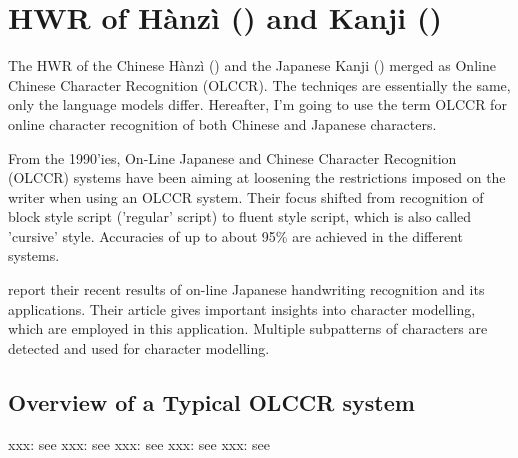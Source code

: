 \section{HWR of Hànzì () and Kanji ()}
\label{sec:hwrofhanziandkanji}


The HWR of the Chinese Hànzì () and the Japanese Kanji () 
merged as Online Chinese Character Recognition (OLCCR). The techniqes are 
essentially the same, only the language models differ. Hereafter, I'm going to 
use the term OLCCR for online character recognition of both Chinese and Japanese
characters.

From the 1990'ies, On-Line Japanese and Chinese Character Recognition 
(OLCCR) systems have been aiming at loosening the restrictions imposed on 
the writer when using an OLCCR system. Their focus shifted from recognition 
of block style script ('regular' script) to fluent style script, 
which is also called 'cursive' style. Accuracies of up to about 95\% are
achieved in the different systems.

 report their recent results of on-line Japanese 
handwriting recognition and its applications. Their article gives 
important insights into character modelling, which are employed in 
this application. Multiple subpatterns of characters are detected and used for
character modelling.

\subsection{Overview of a Typical OLCCR system}

xxx: see \cite{ChenLee1996} 
xxx: see \cite{Nakagawa2008}
xxx: see \cite{Nakai2003} 
xxx: see \cite{Tokuno2002} 
xxx: see \cite{Shimodaira2003} 

